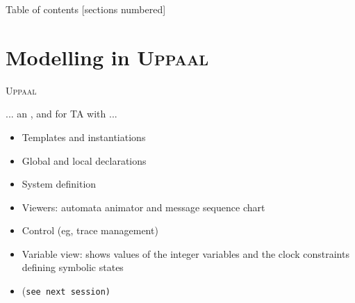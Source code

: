 \documentclass[aspectratio=169]{beamer}
\def\uppaal{\textsc{Uppaal}}
\begin{document}
\begin{frame}{Table of contents}
  [sections numbered]
  \tableofcontents[hideallsubsections]
\end{frame}




\section{Modelling in \uppaal}
\begin{slide}{\uppaal}
\small

... an ,   and  for TA with  ...

\vspace*{-3mm}
\begin{itemize}
\item \alert{Templates} and \alert{instantiations}
\item Global and local \alert{declarations}
\item \alert{System definition}
\end{itemize}

\vspace*{-3mm}
\begin{itemize}
\item Viewers: \alert{automata animator} and \alert{message sequence chart}
\item Control (eg, \alert{trace} management)
\item Variable view: shows values of the integer variables and the clock constraints defining symbolic states
\end{itemize}

\vspace*{-3mm}
\begin{itemize}
\item (\texttt{see next session)}
\end{itemize}

\end{slide}
\end{document}
